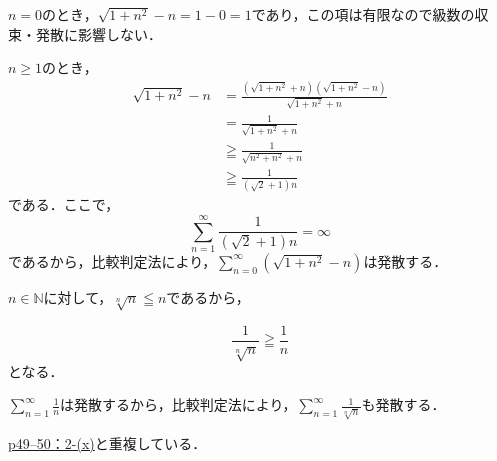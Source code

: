 
\begin{tanswer}
    $n =0$のとき，$\sqrt{1+n^2}-n =1-0= 1$であり，この項は有限なので級数の収束・発散に影響しない．

    $n \geq 1$のとき，
    \begin{align*}
        \sqrt{1+n^2}-n & = \frac{(\sqrt{1+n^2}+n)(\sqrt{1+n^2}-n)}{\sqrt{1+n^2}+n} \\
                       & = \frac{1}{\sqrt{1+n^2}+n}                                \\
                       & \geqq \frac{1}{\sqrt{n^2+n^2}+n}                          \\
                       & \geqq \frac{1}{(\sqrt{2}+1)n}
    \end{align*}
    である．ここで，
    \[
        \sum_{n=1}^{\infty} \frac{1}{(\sqrt{2}+1)n} =\infty
    \]
    であるから，比較判定法により，$ \sum_{n=0}^{\infty} ( \sqrt{1+n^2}-n )$は発散する．
\end{tanswer}


\begin{tanswer}
    $n \in \mathbb{N}$に対して，$ \sqrt[n]{n} \leqq n$であるから，

    \[
        \frac{1}{\sqrt[n]{n}} \geqq \frac{1}{n}
    \]
    となる．

    $ \sum_{n=1}^{\infty} \frac{1}{n}$は発散するから，比較判定法により，$ \sum_{n=1}^{\infty} \frac{1}{\sqrt[n]{n}}$も発散する．
\end{tanswer}


\hyperref[p49--50：2-(x)]{p49--50：2-(x)}と重複している．
